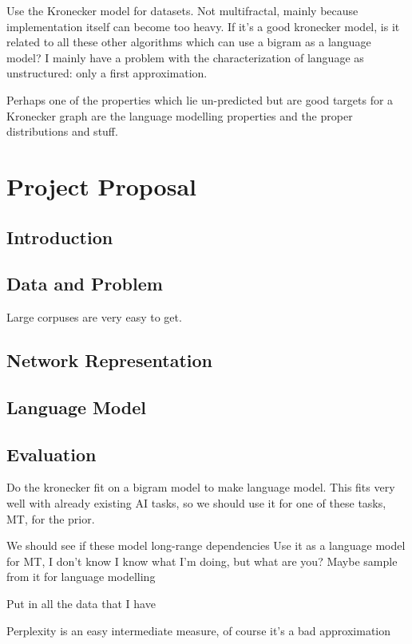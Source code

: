 \documentclass[12pt]{article}
\begin{document}
Use the Kronecker model for datasets. Not multifractal, mainly because implementation itself can become too heavy. If it's a good kronecker model, is it related to all these other algorithms which can use a bigram as a language model? I mainly have a problem with the characterization of language as unstructured: only a first approximation.

Perhaps one of the properties which lie un-predicted but are good targets for a Kronecker graph are the language modelling properties and the proper distributions and stuff.

\section{Project Proposal}

\subsection{Introduction}
\subsection{Data and Problem}
Large corpuses are very easy to get. %
\subsection{Network Representation}
\subsection{Language Model}
\subsection{Evaluation}
Do the kronecker fit on a bigram model to make language model. This fits very well with already existing AI tasks, so we should use it for one of these tasks, MT, for the prior.

We should see if these model long-range dependencies
Use it as a language model for MT, I don't know
I know what I'm doing, but what are you?
Maybe sample from it for language modelling

Put in all the data that I have

Perplexity is an easy intermediate measure, of course it's a bad approximation

\end{document}
